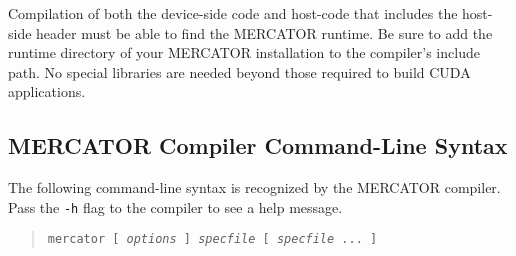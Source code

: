 \documentclass[11pt]{article}
\begin{document}
Compilation of both the device-side code and host-code that includes
the host-side header must be able to find the MERCATOR runtime.  Be
sure to add the runtime directory of your MERCATOR installation to the
compiler's include path.  No special libraries are needed beyond those
required to build CUDA applications.

\subsection{MERCATOR Compiler Command-Line Syntax}

The following command-line syntax is recognized by the MERCATOR
compiler.  Pass the \texttt{-h} flag to the compiler to see a help
message.
\begin{quote}
\texttt{mercator [ \textit{options} ] \textit{specfile} [ \textit{specfile} ... ]}
\end{quote}
 
\end{document}
